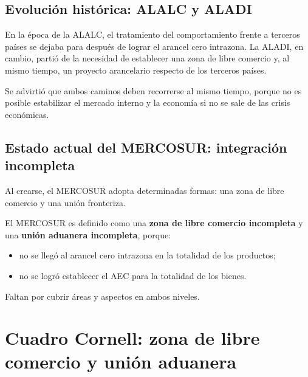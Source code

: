 \documentclass[12pt,oneside]{book}
\begin{document}
\subsection{Evolución histórica: ALALC y ALADI}

En la época de la ALALC, el tratamiento del comportamiento frente a terceros países se dejaba para después de lograr el arancel cero intrazona. La ALADI, en cambio, partió de la necesidad de establecer una zona de libre comercio y, al mismo tiempo, un proyecto arancelario respecto de los terceros países.

Se advirtió que ambos caminos deben recorrerse al mismo tiempo, porque no es posible estabilizar el mercado interno y la economía si no se sale de las crisis económicas.

\subsection{Estado actual del MERCOSUR: integración incompleta}

Al crearse, el MERCOSUR adopta determinadas formas: una zona de libre comercio y una unión fronteriza.

\begin{important}
El MERCOSUR es definido como una \textbf{zona de libre comercio incompleta} y una \textbf{unión aduanera incompleta}, porque:
\begin{itemize}
    \item no se llegó al arancel cero intrazona en la totalidad de los productos;
    \item no se logró establecer el AEC para la totalidad de los bienes.
\end{itemize}
Faltan por cubrir áreas y aspectos en ambos niveles.
\end{important}

\section{Cuadro Cornell: zona de libre comercio y unión aduanera}
\end{document}

